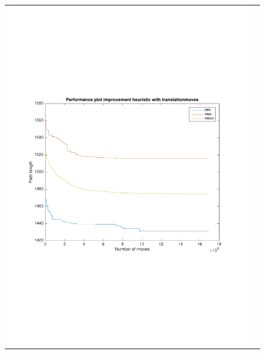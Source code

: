 \documentclass[a4paper, 11pt]{scrartcl}
\begin{document}
\begin{figure}[!ht]
\begin{tabular}{cc}
    \includegraphics[scale=0.4, trim={3cm 6cm 1cm 6cm}]{../figures/perfPlot_translation.pdf} \\ 

\end{tabular}
\end{figure}
\end{document}
